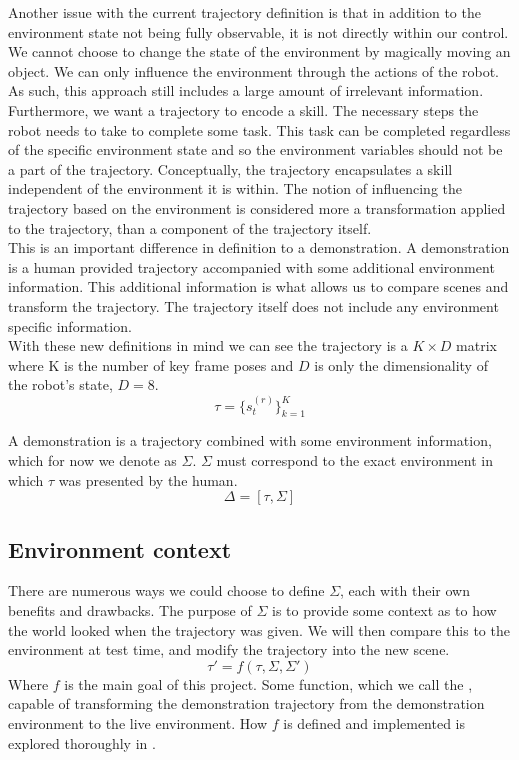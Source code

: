 Another issue with the current trajectory definition is that in addition to the environment state not being fully observable, it is not directly within our control. We cannot choose to change the state of the environment by magically moving an object. We can only influence the environment through the actions of the robot. As such, this approach still includes a large amount of irrelevant information. Furthermore, we want a trajectory to encode a skill. The necessary steps the robot needs to take to complete some task. This task can be completed regardless of the specific environment state and so the environment variables should not be a part of the trajectory. Conceptually, the trajectory encapsulates a skill independent of the environment it is within. The notion of influencing the trajectory based on the environment is considered more a transformation applied to the trajectory, than a component of the trajectory itself.\\

This is an important difference in definition to a demonstration. A demonstration is a human provided trajectory accompanied with some additional environment information. This additional information is what allows us to compare scenes and transform the trajectory. The trajectory itself does not include any environment specific information.\\

With these new definitions in mind we can see the trajectory is a $K \times D$ matrix where K is the number of key frame poses and $D$ is only the dimensionality of the robot's state, $D = 8$.
$$\tau = \{s^{(r)}_t\}_{k=1}^K$$

A demonstration is a trajectory combined with some environment information, which for now we denote as $\Sigma$. $\Sigma$ must correspond to the exact environment in which $\tau$ was presented by the human.
$$\Delta = [\tau, \Sigma]$$

\subsection{Environment context}
There are numerous ways we could choose to define $\Sigma$, each with their own benefits and drawbacks. The purpose of $\Sigma$ is to provide some context as to how the world looked when the trajectory was given. We will then compare this to the environment at test time, and modify the trajectory into the new scene.
$$\tau' = f(\tau, \Sigma, \Sigma')$$
Where $f$ is the main goal of this project. Some function, which we call the , capable of transforming the demonstration trajectory from the demonstration environment to the live environment. How $f$ is defined and implemented is explored thoroughly in .\\

